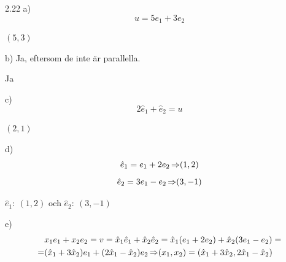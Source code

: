 \begin{task}{2.22 a)}
	\[u=5e_1+3e_2\]
	
	\ans $(5,3)$
\end{task}

\begin{task}{b)}
	Ja, eftersom de inte är parallella.
	
	\ans Ja
\end{task}

\begin{task}{c)}
	\[2\hat{e}_1+\hat{e}_2=u\]

	\ans $(2,1)$
\end{task}

\begin{task}{d)}
	\[\hat{e}_1=e_1+2e_2 \operatorname{\Rightarrow} (1,2)\]
	\[\hat{e}_2=3e_1-e_2 \operatorname{\Rightarrow} (3,-1)\]
	
	\ans $\hat{e}_1:~(1,2)$ och $\hat{e}_2:~(3,-1)$
\end{task}

\begin{task}{e)}
	\begin{align*}
		&x_1e_1+x_2e_2=v=
		\hat{x}_1\hat{e}_1+\hat{x}_2\hat{e}_2=
		\hat{x}_1(e_1+2e_2)+\hat{x}_2(3e_1-e_2)= \\ =
		&(\hat{x}_1+3\hat{x}_2)e_1+(2\hat{x}_1-\hat{x}_2)e_2 \operatorname{\Rightarrow} (x_1,x_2)=(\hat{x}_1+3\hat{x}_2,2\hat{x}_1-\hat{x}_2)
	\end{align*}
\end{task}

